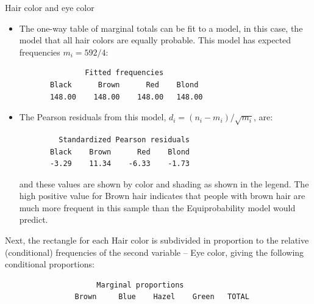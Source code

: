 \begin{Example}[haireye2a]{Hair color and eye color}
\begin{itemize}
\item The one-way table of marginal totals can be fit to a model, in this
case, the model that all hair colors are equally probable.  This model
has expected frequencies $m_i = 592/4$:
\begin{verbatim} 
               Fitted frequencies
       Black      Brown      Red    Blond
       148.00    148.00    148.00   148.00
\end{verbatim}
\item The Pearson residuals from this model, $d_i = ( n_i - m_i ) / \sqrt{m_i}$, are:
\begin{verbatim} 
         Standardized Pearson residuals
       Black    Brown      Red    Blond
       -3.29    11.34    -6.33    -1.73
\end{verbatim}
and these values are shown by color and shading as shown in the legend.
The high positive value for Brown hair indicates that people
with brown hair are much more frequent in this sample than 
the Equiprobability model would predict.
\end{itemize}

Next, the rectangle for each Hair color is subdivided in proportion
to the relative (conditional) frequencies of the second variable --
Eye color, giving the following conditional proportions:
\begin{verbatim} 
                     Marginal proportions
                Brown     Blue    Hazel    Green   TOTAL


\end{verbatim}
\end{Example}
